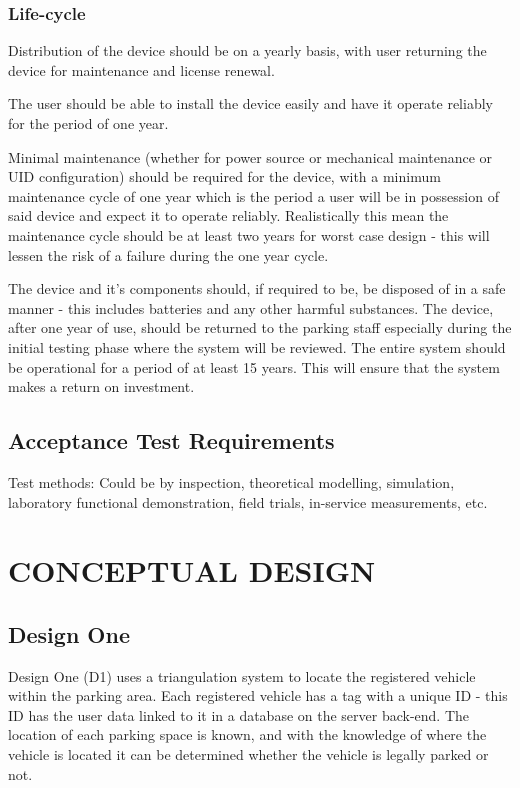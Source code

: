 \subsubsection{Life-cycle}
Distribution of the device should be on a yearly basis, with user returning the device for maintenance and license renewal.

The user should be able to install the device easily and have it operate reliably for the period of one year. 

Minimal maintenance (whether for power source or mechanical maintenance or UID configuration) should be required for the device, with a minimum maintenance cycle of one year which is the period a user will be in possession of said device and expect it to operate reliably. Realistically this mean the maintenance cycle should be at least two years for worst case design - this will lessen the risk of a failure during the one year cycle.

The device and it's components should, if required to be, be disposed of in a safe manner - this includes batteries and any other harmful substances. The device, after one year of use, should be returned to the parking staff especially during the initial testing phase where the system will be reviewed. The entire system should be operational for a period of at least 15 years. This will ensure that the system makes a return on investment.

\newpage
\subsection{Acceptance Test Requirements}
Test methods: Could be by inspection, theoretical modelling, simulation, laboratory functional demonstration, field trials, in-service measurements, etc.

\newpage
\section{CONCEPTUAL DESIGN}
\subsection{Design One}
Design One (D1) uses a triangulation system to locate the registered vehicle within the parking area. Each registered vehicle has a tag with a unique ID - this ID has the user data linked to it in a database on the server back-end. The location of each parking space is known, and with the knowledge of where the vehicle is located it can be determined whether the vehicle is legally parked or not. 
  
